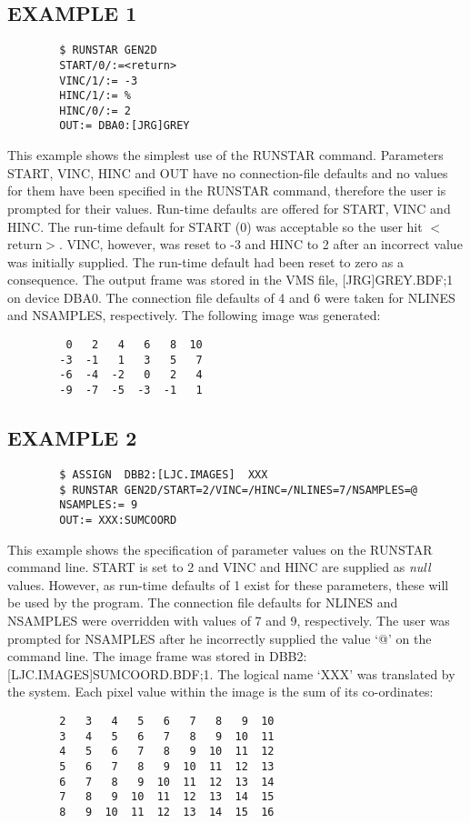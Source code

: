 \subsection {EXAMPLE 1}
\begin{verbatim}
        $ RUNSTAR GEN2D
        START/0/:=<return>
        VINC/1/:= -3
        HINC/1/:= %
        HINC/0/:= 2
        OUT:= DBA0:[JRG]GREY
\end{verbatim}
This example shows the simplest use of the RUNSTAR command.
Parameters START, VINC, HINC and OUT have no connection-file defaults and no
values for them have been specified in the RUNSTAR command, therefore the user
is prompted for their values.
Run-time defaults are offered for START, VINC and HINC.
The run-time default for START (0) was acceptable so the user hit $<$return$>$.
VINC, however, was reset to -3 and HINC to 2 after an incorrect value was
initially supplied.
The run-time default had been reset to zero as a consequence.
The output frame was stored in the VMS file, [JRG]GREY.BDF;1 on device DBA0.
The connection file defaults of 4 and 6 were taken for NLINES and NSAMPLES,
respectively.
The following image was generated:
\begin{verbatim}
         0   2   4   6   8  10
        -3  -1   1   3   5   7
        -6  -4  -2   0   2   4
        -9  -7  -5  -3  -1   1
\end{verbatim}
\subsection {EXAMPLE 2}
\begin{verbatim}
        $ ASSIGN  DBB2:[LJC.IMAGES]  XXX
        $ RUNSTAR GEN2D/START=2/VINC=/HINC=/NLINES=7/NSAMPLES=@
        NSAMPLES:= 9
        OUT:= XXX:SUMCOORD
\end{verbatim}
This example shows the specification of parameter values on the RUNSTAR command
line.
START is set to 2 and VINC and HINC are supplied as {\em null} values.
However, as run-time defaults of 1 exist for these parameters, these will be
used by the program.
The connection file defaults for NLINES and NSAMPLES were overridden with
values of 7 and 9, respectively.
The user was prompted for NSAMPLES after he incorrectly supplied the value `@'
on the command line.
The image frame was stored in DBB2:[LJC.IMAGES]SUMCOORD.BDF;1.
The logical name `XXX' was translated by the system.
Each pixel value within the image is the sum of its co-ordinates:
\begin{verbatim}
        2   3   4   5   6   7   8   9  10
        3   4   5   6   7   8   9  10  11
        4   5   6   7   8   9  10  11  12
        5   6   7   8   9  10  11  12  13
        6   7   8   9  10  11  12  13  14
        7   8   9  10  11  12  13  14  15
        8   9  10  11  12  13  14  15  16
\end{verbatim}
